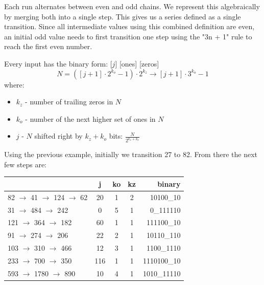 \documentclass[preprint,natbib]{sigplanconf}
\begin{document}
Each run alternates between even and odd chains. We represent this algebraically by merging both into a single step. This gives us a series defined as a single transition. Since all intermediate values using this combined definition are even, an initial odd value needs to first transition one step using the "3n + 1" rule to reach the first even number.

Every input has the binary form: [$j$] [ones] [zeros]
\[
    N = ([j + 1] \cdot 2^{k_o} - 1) \cdot 2^{k_z} \rightarrow [j + 1] \cdot 3^{k_o} - 1
\]
where:
\begin{itemize}
    \item $k_z$ - number of trailing zeros in $N$
    \item $k_o$ - number of the next higher set of ones in $N$
    \item $j$ - $N$ shifted right by $k_z + k_o$ bits: $\frac{N}{2^{k_z + k_o}}$
\end{itemize}

Using the previous example, initially we transition 27 to 82. From there the next few steps are:

\noindent
\begin{minipage}{\columnwidth}
    \setlength{\tabcolsep}{.35\tabcolsep}
    \centering
    \begin{tabular}{|l|c|c|c|r|}
        \hline
                                         & \textbf{j} & \textbf{ko} & \textbf{kz} & \textbf{binary} \\
        \hline
        82 $\to$ 41  $\to$  124 $\to$ 62 & 20         & 1           & 2           & 10100\_10       \\
        \hline
        31  $\to$  484 $\to$ 242   & 0          & 5           & 1           & 0\_111110       \\
        \hline
        121 $\to$  364 $\to$ 182   & 60         & 1           & 1           & 111100\_10      \\
        \hline
        91 $\to$  274 $\to$ 206   & 22         & 2           & 1           & 10110\_110      \\
        \hline
        103 $\to$  310 $\to$ 466   & 12         & 3           & 1           & 1100\_1110      \\
        \hline
        233 $\to$  700 $\to$ 350   & 116        & 1           & 1           & 1110100\_10     \\
        \hline
        593 $\to$ 1780 $\to$ 890   & 10         & 4           & 1           & 1010\_11110     \\
        \hline
    \end{tabular}
\end{minipage}
\end{document}
